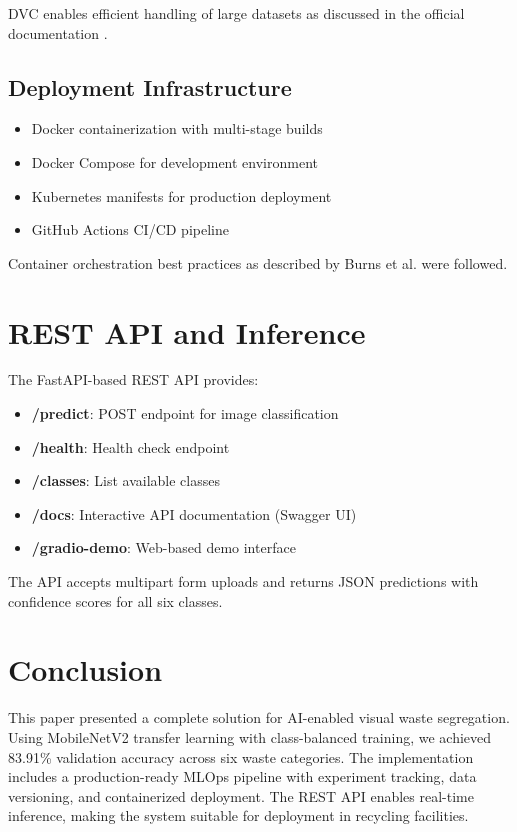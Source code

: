 \documentclass[conference]{IEEEtran}
\begin{document}
DVC enables efficient handling of large datasets as discussed in the official documentation \cite{dvc2024}.

\subsection{Deployment Infrastructure}
\begin{itemize}
    \item Docker containerization with multi-stage builds
    \item Docker Compose for development environment
    \item Kubernetes manifests for production deployment
    \item GitHub Actions CI/CD pipeline
\end{itemize}

Container orchestration best practices as described by Burns et al. \cite{burns2023} were followed.

\section{REST API and Inference}

The FastAPI-based REST API provides:
\begin{itemize}
    \item \textbf{/predict}: POST endpoint for image classification
    \item \textbf{/health}: Health check endpoint
    \item \textbf{/classes}: List available classes
    \item \textbf{/docs}: Interactive API documentation (Swagger UI)
    \item \textbf{/gradio-demo}: Web-based demo interface
\end{itemize}

The API accepts multipart form uploads and returns JSON predictions with confidence scores for all six classes.

\section{Conclusion}
This paper presented a complete solution for AI-enabled visual waste segregation. Using MobileNetV2 transfer learning with class-balanced training, we achieved 83.91\% validation accuracy across six waste categories. The implementation includes a production-ready MLOps pipeline with experiment tracking, data versioning, and containerized deployment. The REST API enables real-time inference, making the system suitable for deployment in recycling facilities.
\end{document}
